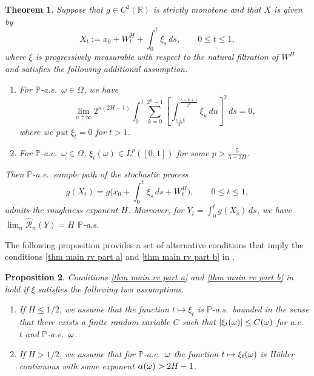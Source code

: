 \documentclass[12pt,reqno]{article}
\def\ua{\uparrow}
\def\wh{\widehat}
\numberwithin{equation}{section}
\def\cR{{\mathscr R}}
\newtheorem{theorem}{Theorem}[section]
\newtheorem{proposition}[theorem]{Proposition}
\theoremstyle{definition}
\def\ua{\uparrow}
\def\wh{\widehat}
\newcommand{\bR}{\mathbb{R}}
\newcommand{\bP}{\mathbb{P}}
\begin{document}
\begin{theorem}\label{thm main rv} 
Suppose that    $g\in C^2(\bR)$ is strictly monotone and that   $X$ is given by 
\begin{equation}\label{XH eq}
X_t:=x_0+W^H_t+\int_0^t\xi_s\,ds,\qquad0\le t\le 1,
\end{equation}
 where $\xi$ is progressively measurable with respect to the natural filtration of $W^H$ and satisfies the following additional assumption. 
 \begin{enumerate}
 	\item \label{thm main rv part a}For $\bP$-a.e.~$\omega \in \Omega$, we have
 	\begin{equation}\label{eq new cond}
 		\lim_{n \ua \infty} 2^{n(2H-1)}\int_{0}^{1}\sum_{k = 0}^{2^n-1}\left[\int_{\frac{s+k}{2^n}}^{\frac{s+k+1}{2^n}}\xi_u\,du\right]^2 \,ds = 0,
 	\end{equation}
	where we put $\xi_t=0$ for $t>1$.
 	\item \label{thm main rv part b} For $\bP$-a.e.~$\omega \in \Omega$, $\xi_t(\omega) \in L^p([0,1])$ for some $p > \frac{5}{5 - 2H}$.
 \end{enumerate}
Then $\bP$-a.e.~sample path of the stochastic process
$$ g(X_t)=g\bigg(x_0+\int_0^t\xi_s\,ds+W^H_t\bigg),\qquad 0\le t\le1,
$$
admits the roughness exponent $H$. Moreover, for
$Y_t = \int_{0}^{t}g(X_s) \,ds$, we have $\lim_{n}\wh\cR_n(Y) =H$ $\bP$-a.s.
\end{theorem}

The following proposition provides a set of alternative conditions that imply the conditions \ref{thm main rv part a} and \ref{thm main rv part b} in .

\begin{proposition}\label{cor main rv} Conditions \ref{thm main rv part a} and \ref{thm main rv part b} in  hold if $\xi$ satisfies the following two assumptions. 
	\begin{enumerate}[{\rm (a')}]
		\item \label{cor main rv part a}If $H \le 1/2$, we assume  that the function $t\mapsto\xi_t$ is $\bP$-a.s.~bounded in the sense that  there exists a finite random variable $C$ such that $|\xi_t(\omega)|\le C(\omega)$ for a.e.~$t$ and $\bP$-a.e.~$\omega$. 
		\item \label{cor main rv part b}If $H>1/2$, we assume that for $\bP$-a.e.~$\omega$ the function $t\mapsto \xi_t(\omega)$ is H\"older continuous with some exponent $\alpha(\omega)>2H-1$.
	\end{enumerate}
\end{proposition}
\end{document}
